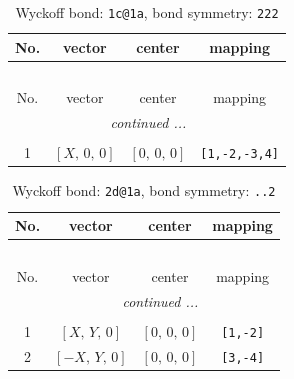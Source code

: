 \documentclass[fleqn,8pt]{jsarticle}
\begin{document}
\renewcommand{\arraystretch}{1.2}
\begin{longtable}{cccc}
\caption{Wyckoff bond: {\tt 1c@1a}, bond symmetry: {\tt 222}}
 \\
 \hline \hline
No. & vector & center & mapping \\ \hline \endfirsthead

\multicolumn{3}{l}{\tablename\ \thetable{}} \\
 \hline \hline
No. & vector & center & mapping \\ \hline \endhead

 \hline \hline
\multicolumn{3}{r}{\footnotesize\it continued ...} \\ \endfoot

 \hline \hline
\multicolumn{3}{r}{} \\ \endlastfoot

1 & $\left[ X,\, 0,\, 0 \right]$ & $\left[ 0,\, 0,\, 0 \right]$ & {\tt [1,-2,-3,4]} \\
\end{longtable}
\renewcommand{\arraystretch}{1.2}
\begin{longtable}{cccc}
\caption{Wyckoff bond: {\tt 2d@1a}, bond symmetry: {\tt ..2}}
 \\
 \hline \hline
No. & vector & center & mapping \\ \hline \endfirsthead

\multicolumn{3}{l}{\tablename\ \thetable{}} \\
 \hline \hline
No. & vector & center & mapping \\ \hline \endhead

 \hline \hline
\multicolumn{3}{r}{\footnotesize\it continued ...} \\ \endfoot

 \hline \hline
\multicolumn{3}{r}{} \\ \endlastfoot

1 & $\left[ X,\, Y,\, 0 \right]$ & $\left[ 0,\, 0,\, 0 \right]$ & {\tt [1,-2]} \\ \hline
2 & $\left[ - X,\, Y,\, 0 \right]$ & $\left[ 0,\, 0,\, 0 \right]$ & {\tt [3,-4]} \\
\end{longtable}
\renewcommand{\arraystretch}{1.2}
\end{document}
